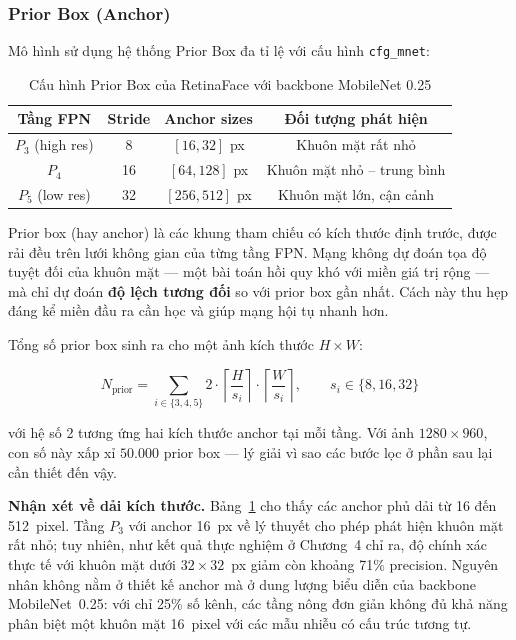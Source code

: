 \subsubsection{Prior Box (Anchor)}

Mô hình sử dụng hệ thống Prior Box đa tỉ lệ với cấu hình \texttt{cfg\_mnet}:

\begin{table}[H]
\caption{Cấu hình Prior Box của RetinaFace với backbone MobileNet 0.25}
\label{tab:prior_box}
\centering
\begin{tabular}{|c|c|c|c|}
\hline
\textbf{Tầng FPN} & \textbf{Stride} & \textbf{Anchor sizes} & \textbf{Đối tượng phát hiện} \\
\hline
$P_3$ (high res) & 8 & $[16, 32]$ px & Khuôn mặt rất nhỏ \\
\hline
$P_4$ & 16 & $[64, 128]$ px & Khuôn mặt nhỏ -- trung bình \\
\hline
$P_5$ (low res) & 32 & $[256, 512]$ px & Khuôn mặt lớn, cận cảnh \\
\hline
\end{tabular}
\end{table}

Prior box (hay anchor) là các khung tham chiếu có kích thước định trước, được rải đều trên lưới không gian của từng tầng FPN. Mạng không dự đoán tọa độ tuyệt đối của khuôn mặt --- một bài toán hồi quy khó với miền giá trị rộng --- mà chỉ dự đoán \textbf{độ lệch tương đối} so với prior box gần nhất. Cách này thu hẹp đáng kể miền đầu ra cần học và giúp mạng hội tụ nhanh hơn.

Tổng số prior box sinh ra cho một ảnh kích thước $H \times W$:

\begin{equation}
\label{eq:num_priors}
N_{\text{prior}} = \sum_{i \in \{3,4,5\}} 2 \cdot \left\lceil \frac{H}{s_i} \right\rceil \cdot \left\lceil \frac{W}{s_i} \right\rceil, \qquad s_i \in \{8, 16, 32\}
\end{equation}

\noindent với hệ số 2 tương ứng hai kích thước anchor tại mỗi tầng. Với ảnh $1280 \times 960$, con số này xấp xỉ $50.000$ prior box --- lý giải vì sao các bước lọc ở phần sau lại cần thiết đến vậy.

\textbf{Nhận xét về dải kích thước.} Bảng~\ref{tab:prior_box} cho thấy các anchor phủ dải từ 16 đến 512~pixel. Tầng $P_3$ với anchor 16~px về lý thuyết cho phép phát hiện khuôn mặt rất nhỏ; tuy nhiên, như kết quả thực nghiệm ở Chương~4 chỉ ra, độ chính xác thực tế với khuôn mặt dưới $32\times32$~px giảm còn khoảng 71\% precision. Nguyên nhân không nằm ở thiết kế anchor mà ở dung lượng biểu diễn của backbone MobileNet~0.25: với chỉ 25\% số kênh, các tầng nông đơn giản không đủ khả năng phân biệt một khuôn mặt 16~pixel với các mẫu nhiễu có cấu trúc tương tự.


